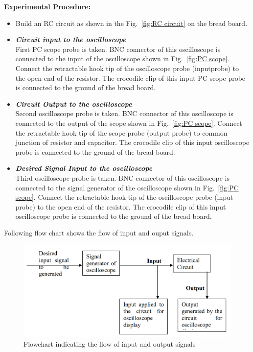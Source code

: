 \documentclass[9pt]{scrreprt}
\begin{document}
\textbf{Experimental Procedure:}
\begin{itemize}
\item Build an RC circuit as shown in the Fig.~\ref{fig:RC circuit} on the bread board.
\item \textit{\textbf{Circuit input to the oscilloscope}}\\
First PC scope probe is taken. BNC connector of this oscilloscope is connected to the input of the oscilloscope shown in Fig.~\ref{fig:PC scope}. Connect the retractable hook tip of the oscilloscope probe (inputprobe) to the open end of the resistor. The crocodile clip of this input PC scope probe is connected to the ground of the bread board.
\item \textit{\textbf{Circuit Output to the oscilloscope}}\\
Second oscilloscope probe is taken. BNC connector of this oscilloscope is connected to the output of the scope shown in Fig.~\ref{fig:PC scope}. Connect the retractable hook tip of the scope probe (output probe) to common junction of resistor and capacitor. The crocodile clip of this input oscilloscope probe is connected to the ground of the bread board.
\item \textit{\textbf{Desired Signal Input to the oscilloscope}}\\
Third oscilloscope probe is taken. BNC connector of this oscilloscope is connected to the signal generator of the oscilloscope shown in Fig.~\ref{fig:PC scope}. Connect the retractable hook tip of the oscilloscope probe (input probe) to the open end of the resistor. The crocodile clip of this input oscilloscope probe is connected to the ground of the bread board.
\end{itemize}

Following flow chart shows the flow of input and ouput signals.

\begin{figure}[H]
	\centering
	\includegraphics[width=0.8\linewidth]{logos/Flow_chart_IO.PNG}
	\caption{Flowchart indicating the flow of input and output signals}
	\label{fig:Flow chart IO}
\end{figure}
\end{document}
